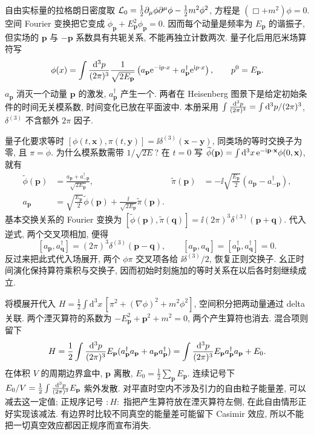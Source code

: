 \label{ch:free-scalar}
自由实标量的拉格朗日密度取 $\mathcal L_0=\frac12\partial_\mu\phi\partial^\mu\phi-\frac12m^2\phi^2$, 方程是 $(\Box+m^2)\phi=0$. 空间 Fourier 变换把它变成 $\ddot\phi_{\mathbf p}+E_{\mathbf p}^2\phi_{\mathbf p}=0$. 因而每个动量是频率为 $E_{\mathbf p}$ 的谐振子, 但实场的 $\mathbf p$ 与 $-\mathbf p$ 系数具有共轭关系, 不能再独立计数两次. 量子化后用厄米场算符写
\begin{equation}\label{eq:scalar-mode}
\phi(x)=\int\frac{\mathrm d^3p}{(2\pi)^3}\frac1{\sqrt{2E_{\mathbf p}}}
\left(a_{\mathbf p}\mathrm e^{-\mathrm i p\cdot x}+a^\dagger_{\mathbf p}\mathrm e^{\mathrm i p\cdot x}\right),
\qquad p^0=E_{\mathbf p}.
\end{equation}
$a_{\mathbf p}$ 消灭一个动量 $\mathbf p$ 的激发, $a^\dagger_{\mathbf p}$ 产生一个. 两者在 Heisenberg 图景下是给定初始条件的时间无关模系数, 时间变化已放在平面波中. 本册采用 $\int\frac{\mathrm d^3p}{(2\pi)^3}=\int\mathrm d^3p/(2\pi)^3$, $\delta^{(3)}$ 不含额外 $2\pi$ 因子.

量子化要求等时 $[\phi(t,\mathbf x),\pi(t,\mathbf y)]=\ii\delta^{(3)}(\mathbf x-\mathbf y)$, 同类场的等时交换子为零, 且 $\pi=\dot\phi$. 为什么模系数需带 $1/\sqrt{2E}$? 在 $t=0$ 写 $\widetilde\phi(\mathbf p)=\int\mathrm d^3x\,\mathrm e^{-\mathrm i\mathbf p\cdot\mathbf x}\phi(0,\mathbf x)$, 就有
\begin{align*}
\widetilde\phi(\mathbf p)&=\frac{a_{\mathbf p}+a^\dagger_{-\mathbf p}}{\sqrt{2E_{\mathbf p}}},&
\widetilde\pi(\mathbf p)&=-\ii\sqrt{\frac{E_{\mathbf p}}2}(a_{\mathbf p}-a^\dagger_{-\mathbf p}),\\
a_{\mathbf p}&=\sqrt{\frac{E_{\mathbf p}}2}\widetilde\phi(\mathbf p)+
\frac\ii{\sqrt{2E_{\mathbf p}}}\widetilde\pi(\mathbf p).
\end{align*}
基本交换关系的 Fourier 变换为 $[\widetilde\phi(\mathbf p),\widetilde\pi(\mathbf q)]=\ii(2\pi)^3\delta^{(3)}(\mathbf p+\mathbf q)$. 代入逆式, 两个交叉项相加, 便得
\begin{equation}\label{eq:scalar-a-comm}
[a_{\mathbf p},a^\dagger_{\mathbf q}]=(2\pi)^3\delta^{(3)}(\mathbf p-\mathbf q),\qquad
[a_{\mathbf p},a_{\mathbf q}]=[a^\dagger_{\mathbf p},a^\dagger_{\mathbf q}]=0.
\end{equation}
反过来把此式代入场展开, 两个 $\phi\pi$ 交叉项各给 $\ii\delta^{(3)}/2$, 恢复正则交换子. 幺正时间演化保持算符乘积与交换子, 因而初始时刻施加的等时关系在以后各时刻继续成立.

将模展开代入 $H=\frac12\int\mathrm d^3x\,[\pi^2+(\nabla\phi)^2+m^2\phi^2]$, 空间积分把两动量通过 delta 关联. 两个湮灭算符的系数为 $-E_{\mathbf p}^2+\mathbf p^2+m^2=0$, 两个产生算符也消去. 混合项则留下
\[
H=\frac12\int\frac{\mathrm d^3p}{(2\pi)^3} E_{\mathbf p}(a^\dagger_{\mathbf p}a_{\mathbf p}+a_{\mathbf p}a^\dagger_{\mathbf p})
=\int\frac{\mathrm d^3p}{(2\pi)^3} E_{\mathbf p}a^\dagger_{\mathbf p}a_{\mathbf p}+E_0.
\]
在体积 $V$ 的周期边界盒中, $\mathbf p$ 离散, $E_0=\frac12\sum_{\mathbf p}E_{\mathbf p}$. 连续记号下 $E_0/V=\frac12\int\frac{\mathrm d^3p}{(2\pi)^3} E_{\mathbf p}$ 紫外发散. 对平直时空内不涉及引力的自由粒子能量差, 可以减去这一定值; 正规序记号 $:H:$ 指把产生算符放在湮灭算符左侧, 在此自由情形正好实现该减法. 有边界时比较不同真空的能量差可能留下 Casimir 效应, 所以不能把一切真空效应都因正规序而宣布消失.


